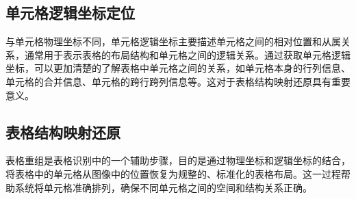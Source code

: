 \documentclass[../article.tex]{subfiles} %
\begin{document}
\subsection{单元格逻辑坐标定位}

与单元格物理坐标不同，单元格逻辑坐标主要描述单元格之间的相对位置和从属关系，通常用于表示表格的布局结构和单元格之间的逻辑关系。通过获取单元格逻辑坐标，可以更加清楚的了解表格中单元格之间的关系，如单元格本身的行列信息、单元格的合并信息、单元格的跨行跨列信息等。这对于表格结构映射还原具有重要意义。

\subsection{表格结构映射还原}

表格重组是表格识别中的一个辅助步骤\cite{soft-nms}，目的是通过物理坐标和逻辑坐标的结合，将表格中的单元格从图像中的位置恢复为规整的、标准化的表格布局。这一过程帮助系统将单元格准确排列\cite{solov2}，确保不同单元格之间的空间和结构关系正确。
\end{document}
